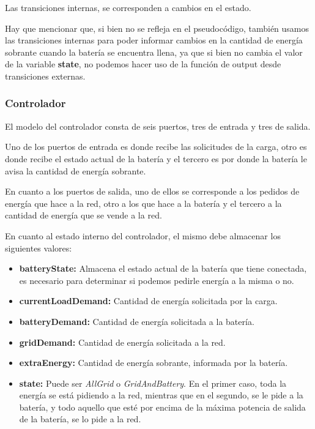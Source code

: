 Las transiciones internas, se corresponden a cambios en el estado.



Hay que mencionar que, si bien no se refleja en el pseudocódigo, también usamos las
transiciones internas para poder informar cambios en la cantidad de energía sobrante cuando
la batería se encuentra llena, ya que si bien no cambia el valor de la variable \textbf{state},
no podemos hacer uso de la función de output desde transiciones externas.

\subsubsection{Controlador}

El modelo del controlador consta de seis puertos, tres de entrada y tres de salida.

Uno de los puertos de entrada es donde recibe las solicitudes de la carga, otro
es donde recibe el estado actual de la batería y el tercero es por donde la batería 
le avisa la cantidad de energía sobrante.

En cuanto a los puertos de salida, uno de ellos se corresponde a los pedidos de 
energía que hace a la red, otro a los que hace a la batería y el tercero a la cantidad de 
energía que se vende a la red.

En cuanto al estado interno del controlador, el mismo debe almacenar los siguientes valores:

\begin{itemize}
    \item \textbf{batteryState:} Almacena el estado actual de la batería que tiene conectada,
    es necesario para determinar si podemos pedirle energía a la misma o no.
    \item \textbf{currentLoadDemand:} Cantidad de energía solicitada por la carga.
    \item \textbf{batteryDemand:} Cantidad de energía solicitada a la batería.
    \item \textbf{gridDemand:} Cantidad de energía solicitada a la red.
    \item \textbf{extraEnergy:} Cantidad de energía sobrante, informada por la batería.
    \item \textbf{state:} Puede ser \emph{AllGrid} o \emph{GridAndBattery}. En el primer
        caso, toda la energía se está pidiendo a la red, mientras que en el segundo, se
        le pide a la batería, y todo aquello que esté por encima de la máxima potencia
        de salida de la batería, se lo pide a la red.
\end{itemize}

